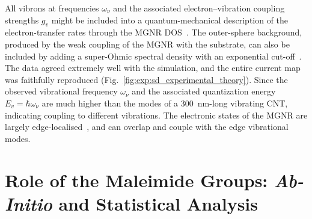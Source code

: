 \begin{table}
    \caption{\label{tab:simulated_stability_diagram}
        Simulation parameter for the vibrational electron transport model}
\end{table}

All vibrons at frequencies $\omega_\nu$ and the associated electron--vibration coupling strengths $g_v$ might be included into a quantum-mechanical description of the electron-transfer rates through the \gls{MGNR} \gls{DOS}~\cite{thomas2019understanding}. The outer-sphere background, produced by the weak coupling of the MGNR with the substrate, can also be included by adding a super-Ohmic spectral density with an exponential cut-off~\cite{gehring2017distinguishing}. The data agreed extremely well with the simulation, and the entire current map was faithfully reproduced (Fig.~\ref{fig:exp:sd_experimental_theory}). Since the observed vibrational frequency $\omega_\nu$ and the associated quantization energy $E_v=\hbar \omega_\nu$ are much higher than the modes of a \SI{300}{\nano\metre}-long vibrating \gls{CNT}, indicating coupling to different vibrations. The electronic states of the \gls{MGNR} are largely edge-localised~\cite{savin2016localized}, and can overlap and couple with the edge vibrational modes.

\section{Role of the Maleimide Groups: \textit{Ab-Initio} and Statistical Analysis}

